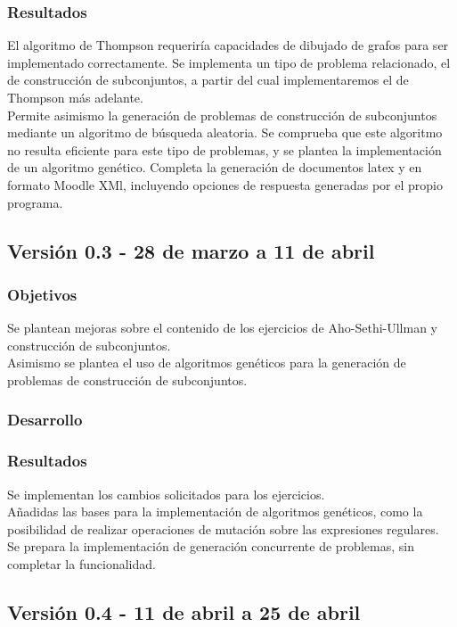 \subsubsection{Resultados}

El algoritmo de Thompson requeriría capacidades de dibujado de grafos para ser implementado correctamente.
Se implementa un tipo de problema relacionado, el de construcción de subconjuntos, a partir del cual implementaremos el de Thompson más adelante.
\\
Permite asimismo la generación de problemas de construcción de subconjuntos mediante un algoritmo de búsqueda aleatoria.
Se comprueba que este algoritmo no resulta eficiente para este tipo de problemas, y se plantea la implementación de un algoritmo genético.
Completa la generación de documentos latex y en formato Moodle XMl, incluyendo opciones de respuesta generadas por el propio programa.

\subsection{Versión 0.3 - 28 de marzo a 11 de abril}

\subsubsection{Objetivos}
Se plantean mejoras sobre el contenido de los ejercicios de Aho-Sethi-Ullman y construcción de subconjuntos.
\\
Asimismo se plantea el uso de algoritmos genéticos para la generación de problemas de construcción de subconjuntos.

\subsubsection{Desarrollo}

\subsubsection{Resultados}
Se implementan los cambios solicitados para los ejercicios.
\\
Añadidas las bases para la implementación de algoritmos genéticos, como la posibilidad de realizar operaciones de mutación sobre las expresiones regulares.
\\
Se prepara la implementación de generación concurrente de problemas, sin completar la funcionalidad.

\subsection{Versión 0.4 - 11 de abril a 25 de abril}


